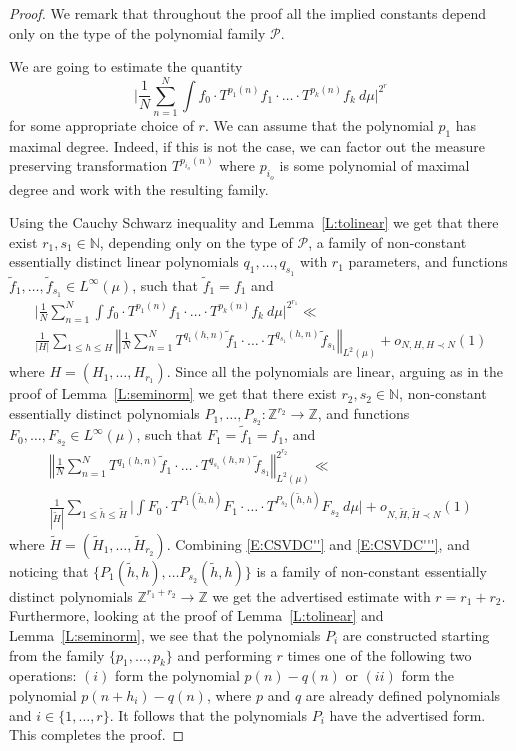 \documentclass[11pt]{amsart}
\newcommand{\N}{\mathbb{N}}
\newcommand{\Z}{\mathbb{Z}}
\newcommand{\norm}[1]{\left\Vert #1\right\Vert}
\theoremstyle{plain}
\theoremstyle{definition}
\theoremstyle{remark}
\begin{document}
\begin{proof}
We remark that  throughout the proof all the implied constants depend only on the type of
  the polynomial family  $\mathcal{P}$.

We are going to estimate the quantity
$$
\Big| \frac{1}{N}\sum_{n=1}^N \int f_0\cdot
    T^{p_1(n)}f_1\cdot \ldots\cdot
    T^{p_k(n)}f_k \ d\mu \Big|^{2^r}
$$
for some appropriate choice of $r$.
 We can assume that the polynomial $p_1$ has maximal degree. Indeed, if this is not the case,
we can  factor out   the measure preserving transformation $T^{p_{i_o}(n)}$ where
  $p_{i_o}$ is some polynomial of maximal degree and work with the resulting family.

Using  the Cauchy Schwarz inequality  and  Lemma~\ref{L:tolinear}
we get that   there exist $r_1,s_1\in\N$, depending
  only on the type of $\mathcal{P}$, a family of
  non-constant essentially distinct linear polynomials $q_1,\ldots, q_{s_1}$ with
  $r_1$ parameters,
  and functions $\tilde{f}_1,\ldots,\tilde{f}_{s_1}\in
  L^{\infty}(\mu)$, such that $\tilde{f}_1=f_1$ and
  \begin{multline}\label{E:CSVDC''}
    \Big| \frac{1}{N}\sum_{n=1}^N \int f_0\cdot
    T^{p_1(n)}f_1\cdot \ldots\cdot
    T^{p_k(n)}f_k \ d\mu \Big|^{2^{r_1}}\ll\\
    \frac{1}{|H|}\sum_{1\leq h\leq H} \norm{\frac{1}{N}\sum_{n=1}^N
     T^{q_1(h,n)}\tilde{f}_1\cdot \ldots\cdot
      T^{q_{s_1}(h,n)}\tilde{f}_{s_1}}_{L^2(\mu)} +o_{N,H, H\prec N}(1)
  \end{multline}
  where $H=(H_1,\ldots,H_{r_1})$. Since all the polynomials are
  linear, arguing as in the proof of Lemma~\ref{L:seminorm} we get
  that there exist $r_2,s_2 \in \N$, non-constant essentially distinct polynomials
  $P_1,\ldots,P_{s_2}\colon \Z^{r_2}\to\Z$, and functions
  $F_0,\ldots,F_{s_2}\in L^\infty(\mu)$, such that $F_1=\tilde{f}_1=f_1$, and
  \begin{multline}\label{E:CSVDC'''}
    \norm{\frac{1}{N}\sum_{n=1}^N T^{q_1(h,n)}\tilde{f}_1\cdot
      \ldots\cdot
      T^{q_{s_1}(h,n)}\tilde{f}_{s_1}}_{L^2(\mu)}^{2^{r_2}}\ll\\
    \frac{1}{|\tilde{H}|}\sum_{1\leq \tilde{h}\leq \tilde{H}}\Big|\int F_0 \cdot
    T^{P_1(\tilde{h},h)}F_1\cdot \ldots\cdot T^{P_{s_2}(\tilde{h},h)}F_{s_2} \ d\mu \Big|
    +o_{N,\tilde{H}, \tilde{H}\prec N}(1)
  \end{multline}
  where $\tilde{H}=(\tilde{H}_1,\ldots,\tilde{H}_{r_2})$. Combining \eqref{E:CSVDC''} and
  \eqref{E:CSVDC'''}, and noticing that $\{P_1(\tilde{h},h),\ldots
  P_{s_2}(\tilde{h},h)\}$ is a family of non-constant essentially distinct polynomials
  $\Z^{r_1+r_2}\to \Z$ we get the advertised estimate with
  $r=r_1+r_2$. Furthermore, looking at the proof of
  Lemma~\ref{L:tolinear} and Lemma~\ref{L:seminorm}, we see that the
  polynomials $P_i$ are constructed starting from the family
  $\{p_1,\ldots,p_k\}$ and performing  $r$ times one of the
  following two operations: $(i)$ form the polynomial $p(n)-q(n)$
  or $(ii)$
 form the polynomial  $p(n+h_i)-q(n)$, where $p$ and $q$ are already defined polynomials and $i\in \{1,\ldots,r\}$.  It follows that the polynomials $P_i$
  have the advertised form. This completes the proof.
\end{proof}
\end{document}
